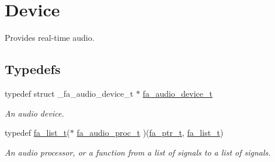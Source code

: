 \hypertarget{group___fa_audio_device}{\section{Device}
\label{group___fa_audio_device}
}


Provides real-\/time audio.  


\subsection*{Typedefs}
\begin{DoxyCompactItemize}
\item 
typedef struct \-\_\-fa\-\_\-audio\-\_\-device\-\_\-t $\ast$ \hyperlink{group___fa_audio_device_ga03de89ee66c6465f8cedd3a0286598f4}{fa\-\_\-audio\-\_\-device\-\_\-t}
\begin{DoxyCompactList}\small\item\em An audio device. \end{DoxyCompactList}\item 
typedef \hyperlink{group___fa_list_ga35ecb12ab934ded0cce0bcf28e3bc5d2}{fa\-\_\-list\-\_\-t}($\ast$ \hyperlink{group___fa_audio_device_gae190189bb20427f20453f2e4d48ecc7b}{fa\-\_\-audio\-\_\-proc\-\_\-t} )(\hyperlink{group___fa_ga915ddeae99ad7568b273d2b876425197}{fa\-\_\-ptr\-\_\-t}, \hyperlink{group___fa_list_ga35ecb12ab934ded0cce0bcf28e3bc5d2}{fa\-\_\-list\-\_\-t})
\begin{DoxyCompactList}\small\item\em An audio processor, or a function from a list of signals to a list of signals. \end{DoxyCompactList}\end{DoxyCompactItemize}
